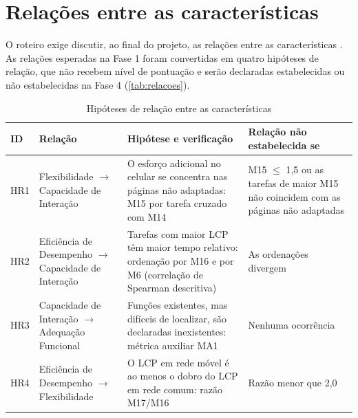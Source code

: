 \begin{figure}[htbp]
\end{figure}

\section{Relações entre as características}
\label{sec:relacoes}

O roteiro exige discutir, ao final do projeto, as relações entre as características \cite{ramos2026roteiro}. As relações esperadas na Fase 1 foram convertidas em quatro hipóteses de relação, que não recebem nível de pontuação e serão declaradas estabelecidas ou não estabelecidas na Fase 4 (\autoref{tab:relacoes}).

\begin{table}[htb]
	\caption{Hipóteses de relação entre as características}
	\label{tab:relacoes}
	\centering
	\scriptsize
	\begin{tabularx}{\textwidth}{C{0.8cm} L{3.4cm} Y L{4.2cm}}
		\toprule
		\textbf{ID} & \textbf{Relação} & \textbf{Hipótese e verificação} & \textbf{Relação não estabelecida se} \\
		\midrule
		HR1 & Flexibilidade $\rightarrow$ Capacidade de Interação & O esforço adicional no celular se concentra nas páginas não adaptadas: M15 por tarefa cruzado com M14 & M15 $\leq$ 1,5 ou as tarefas de maior M15 não coincidem com as páginas não adaptadas \\
		HR2 & Eficiência de Desempenho $\rightarrow$ Capacidade de Interação & Tarefas com maior LCP têm maior tempo relativo: ordenação por M16 e por M6 (correlação de Spearman descritiva) & As ordenações divergem \\
		HR3 & Capacidade de Interação $\rightarrow$ Adequação Funcional & Funções existentes, mas difíceis de localizar, são declaradas inexistentes: métrica auxiliar MA1 & Nenhuma ocorrência \\
		HR4 & Eficiência de Desempenho $\rightarrow$ Flexibilidade & O LCP em rede móvel é ao menos o dobro do LCP em rede comum: razão M17/M16 & Razão menor que 2,0 \\
		\bottomrule
	\end{tabularx}
\end{table}

